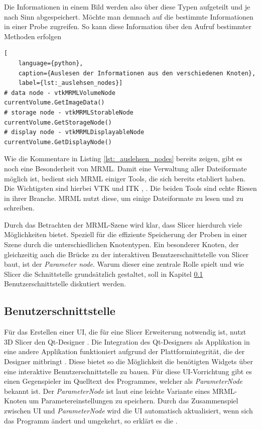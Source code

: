 Die Informationen in einem Bild werden also über diese Typen aufgeteilt und je nach
Sinn abgespeichert. Möchte man demnach auf die bestimmte Informationen in einer
Probe zugreifen. So kann diese Information über den Aufruf bestimmter Methoden erfolgen

\begin{lstlisting}[
	language={python},
	caption={Auslesen der Informationen aus den verschiedenen Knoten},
	label={lst:_auslehsen_nodes}]
# data node - vtkMRMLVolumeNode
currentVolume.GetImageData()
# storage node - vtkMRMLStorableNode
currentVolume.GetStorageNode()
# display node - vtkMRMLDisplayableNode
currentVolume.GetDisplayNode()
\end{lstlisting}

Wie die Kommentare in Listing \ref{lst:_auslehsen_nodes} bereits zeigen, gibt es
noch eine Besonderheit von \ac{MRML}. Damit eine Verwaltung aller Dateiformate
möglich ist, bedient sich \ac{MRML} einiger Tools, die sich bereits etabliert haben.
Die Wichtigsten sind hierbei \ac{VTK} und \ac{ITK} \citep[vgl.][K.~1.1]{vtk2006},
\citep[vgl.][K.~1.1]{itkguide2015}. Die beiden Tools sind echte Riesen in ihrer
Branche. \ac{MRML} nutzt diese, um einige Dateiformate zu lesen und zu schreiben.

Durch das Betrachten der \ac{MRML}-Szene wird klar, dass Slicer hierdurch viele Möglichkeiten
bietet. Speziell für die effiziente Speicherung der Proben in einer Szene durch
die unterschiedlichen Knotentypen. Ein besonderer Knoten, der gleichzeitig auch
die Brücke zu der interaktiven Benutzerschnittstelle von Slicer baut, ist der \textit{Parameter
node}. Warum dieser eine zentrale Rolle spielt und wie Slicer die Schnittstelle grundsätzlich
gestaltet, soll in Kapitel \ref{subsec:benutzerschnitstelle}
Benutzerschnittstelle diskutiert werden.

\subsection{Benutzerschnittstelle}
\label{subsec:benutzerschnitstelle} Für das Erstellen einer \ac{UI}, die für
eine Slicer Erweiterung notwendig ist, nutzt 3D Slicer den Qt-Designer \citep[vgl.][]{qt2024}.
Die Integration des Qt-Designers als Applikation in eine andere Applikation funktioniert
aufgrund der Plattformintegrität, die der Designer mitbringt \citep[vgl.][]{qt2024}.
Diese bietet so die Möglichkeit die benötigten Widgets über eine interaktive
Benutzerschnittstelle zu bauen. Für diese \ac{UI}-Vorrichtung gibt es einen
Gegenspieler im Quelltext des Programmes, welcher als \textit{ParameterNode}
bekannt ist. Der \textit{ParameterNode} ist laut \citet{slicer2024} eine leichte
Variante eines \ac{MRML}-Knoten um Parametereinstellungen zu speichern. Durch das
Zusammenspiel zwischen \ac{UI} und \textit{ParameterNode} wird die \ac{UI}
automatisch aktualisiert, wenn sich das Programm ändert und umgekehrt, so
erklärt es die \citet{slicer2024}.

